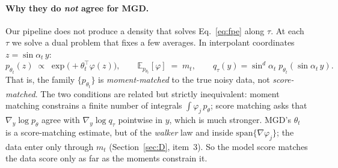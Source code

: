 \documentclass[11pt]{article}
\newcommand{\E}{\mathbb{E}}
\renewcommand{\_}{\origunderscore\allowbreak}
\begin{document}
\paragraph{Why they do \emph{not} agree for MGD.} Our pipeline does not
produce a density that solves Eq.~\ref{eq:fpe} along $\tau$. At each $\tau$
we solve a dual problem that fixes a few averages. In interpolant
coordinates $z=\sin\alpha_t\,y$:
\begin{equation}
  p_{\theta_t}(z) \;\propto\; \exp\!\big(+\theta_t^\top \varphi(z)\big),
  \qquad \E_{p_{\theta_t}}[\varphi] \;=\; m_t,
  \qquad q_\tau(y)=\sin^d\!\alpha_t\;p_{\theta_t}(\sin\alpha_t\,y).
  \label{eq:moment-match}
\end{equation}
That is, the family $\{p_{\theta_t}\}$ is \emph{moment-matched} to the
true noisy data, not \emph{score-matched}. The two conditions are related
but strictly inequivalent: moment matching constrains a finite number of
integrals $\int \varphi_j \,p_\theta$; score matching asks that
$\nabla_y \log p_\theta$ agree with $\nabla_y \log q_\tau$ pointwise in $y$,
which is much stronger. MGD's $\theta_t$ is a score-matching estimate,
but of the \emph{walker} law and inside $\mathrm{span}\{\nabla\varphi_j\}$; the
data enter only through $m_t$ (Section~\ref{sec:D}, item~3). So the model
score matches the data score only as far as the moments constrain it.
\end{document}
